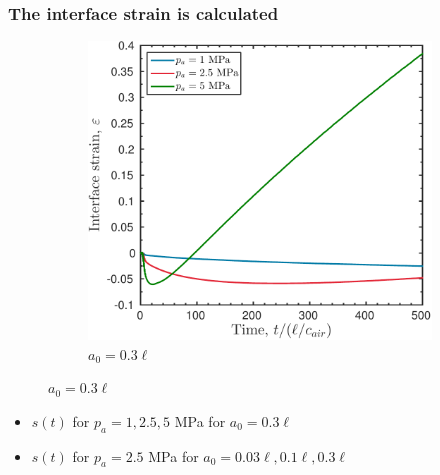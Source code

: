% 
% 
\begin{frame}\frametitle{The interface strain is calculated}
  \begin{figure}
    \centering
    \begin{subfigure}[b]{0.49\textwidth}
      \includegraphics[width=\textwidth]{../figs/lung_figs/rmawave_1_A10,25,50_a30_strain_08-Mar-2017}
      \caption{\label{fig:strain_multi-pa_a30} $a_0 = 0.3\ell$}
    \end{subfigure}
    \label{fig:pa_dependence_strain}
  \end{figure}

  \begin{itemize}
  \item $s(t)$ for $p_a = 1, 2.5, 5$ MPa for $a_0 = 0.3\ell$
  \item $s(t)$ for $p_a = 2.5$ MPa for $a_0 = 0.03\ell, 0.1\ell, 0.3\ell$
  \end{itemize}
\end{frame}

